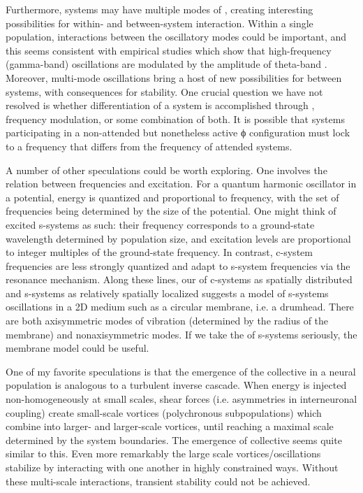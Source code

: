   Furthermore, systems may have multiple modes of , creating interesting possibilities for within- and between-system interaction. Within a single population, interactions between the oscillatory modes could be important, and this seems consistent with empirical studies which show that high-frequency (gamma-band) oscillations are modulated by the amplitude of theta-band . Moreover, multi-mode oscillations bring a host of new possibilities for  between systems, with consequences for stability. One crucial question we have not resolved is whether differentiation of a system is accomplished through , frequency modulation, or some combination of both. It is possible that systems participating in a non-attended but nonetheless active ϕ configuration must lock to a frequency that differs from the frequency of attended systems.

  A number of other speculations could be worth exploring. One involves the relation between  frequencies and excitation. For a quantum harmonic oscillator in a potential, energy is quantized and proportional to frequency, with the set of frequencies being determined by the size of the potential. One might think of excited s-systems as such: their frequency corresponds to a ground-state wavelength determined by population size, and excitation levels are proportional to integer multiples of the ground-state frequency. In contrast, c-system frequencies are less strongly quantized and adapt to s-system frequencies via the resonance mechanism. Along these lines, our  of c-systems as spatially distributed and s-systems as relatively spatially localized suggests a model of s-systems oscillations in a 2D medium such as a circular membrane, i.e. a drumhead. There are both axisymmetric modes of vibration (determined by the radius of the membrane) and nonaxisymmetric modes. If we take the  of s-systems seriously, the membrane model could be useful.    

  One of my favorite speculations is that the emergence of the collective  in a neural population is analogous to a turbulent inverse cascade. When energy is injected non-homogeneously at small scales, shear forces (i.e. asymmetries in interneuronal coupling) create small-scale vortices (polychronous subpopulations) which combine into larger- and larger-scale vortices, until reaching a maximal scale determined by the system boundaries. The emergence of collective  seems quite similar to this. Even more remarkably the large scale vortices/oscillations stabilize by interacting with one another in highly constrained ways. Without these multi-scale interactions, transient stability could not be achieved.

